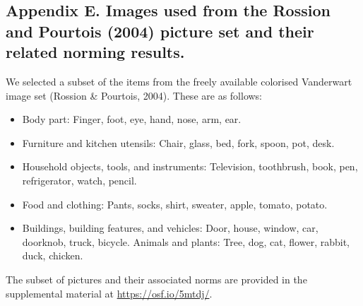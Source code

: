 \clearpage



\begin{appendix}
\section{}
\subsection{Appendix E. Images used from the Rossion and Pourtois (2004)
picture set and their related norming results.}\label{appendix-d}

We selected a subset of the items from the freely available colorised
Vanderwart image set (Rossion \& Pourtois, 2004). These are as follows:

\begin{itemize}
\item
  Body part: Finger, foot, eye, hand, nose, arm, ear.
\item
  Furniture and kitchen utensils: Chair, glass, bed, fork, spoon, pot,
  desk.
\item
  Household objects, tools, and instruments: Television, toothbrush,
  book, pen, refrigerator, watch, pencil.
\item
  Food and clothing: Pants, socks, shirt, sweater, apple, tomato,
  potato.
\item
  Buildings, building features, and vehicles: Door, house, window, car,
  doorknob, truck, bicycle. Animals and plants: Tree, dog, cat, flower,
  rabbit, duck, chicken.
\end{itemize}

The subset of pictures and their associated norms are provided in the
supplemental material at \url{https://osf.io/5mtdj/}.
\end{appendix}
